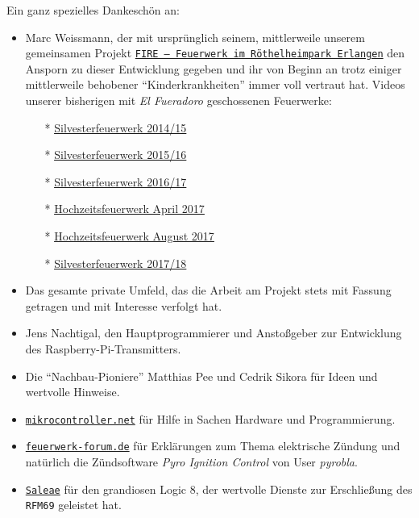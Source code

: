 \documentclass[paper=a4, parskip, numbers=noenddot, toc=listof, headsepline]{scrbook}
\newcommand{\pic}{\emph{Pyro Ignition Control}}
\newcommand{\anlage}{\emph{El Fueradoro}}
\begin{document}
			Ein ganz spezielles Dankeschön an:
			\begin{itemize}
				\item Marc Weissmann, der mit ursprünglich seinem, mittlerweile unserem gemeinsamen Projekt \href{http://www.facebook.com/FIREErlangen}{\texttt{FIRE~-- Feuerwerk im Röthel\-heim\-park Er\-langen}} den Ansporn zu dieser Entwicklung gegeben und ihr von Beginn an trotz einiger mittlerweile behobener \enquote{Kinderkrankheiten} immer voll vertraut hat. Videos unserer bisherigen mit {\anlage} geschossenen Feuerwerke:
				      \begin{itemize}
					      \item[*] \underline{\href{https://vimeo.com/116115628}{Silvesterfeuerwerk 2014/15}}
					      \item[*] \underline{\href{https://vimeo.com/150594996}{Silvesterfeuerwerk 2015/16}}
					      \item[*] \underline{\href{https://vimeo.com/198168273}{Silvesterfeuerwerk 2016/17}}
					      \item[*] \underline{\href{https://www.youtube.com/watch?v=uPTW1dpsVoU}{Hochzeitsfeuerwerk April 2017}}
					      \item[*] \underline{\href{https://www.youtube.com/watch?v=q-nfOxinUgU}{Hochzeitsfeuerwerk August 2017}}
					      \item[*] \underline{\href{https://www.youtube.com/watch?v=unH9tJSg1mw}{Silvesterfeuerwerk 2017/18}}
				      \end{itemize}
				\item Das gesamte private Umfeld, das die Arbeit am Projekt stets mit Fassung getragen und mit Interesse verfolgt hat.
				\item Jens Nachtigal, den Hauptprogrammierer und Anstoßgeber zur Entwicklung des Raspberry-Pi-Transmitters.
				\item Die \enquote{Nachbau-Pioniere} Matthias Pee und Cedrik Sikora für Ideen und wertvolle Hinweise.
				\item \href{http://www.mikrocontroller.net}{\texttt{mikrocontroller.net}} für Hilfe in Sachen Hardware und Programmierung.
				\item \href{http://www.feuerwerk-forum.de}{\texttt{feuerwerk-forum.de}} für Erklärungen zum Thema elektrische Zündung und natürlich die Zündsoftware {\pic} von User \emph{pyrobla}.
				\item \href{http://www.saleae.com}{\texttt{Saleae}} für den grandiosen Logic 8, der wertvolle Dienste zur Erschließung des \texttt{RFM69} geleistet hat.

\end{itemize}
\end{document}
